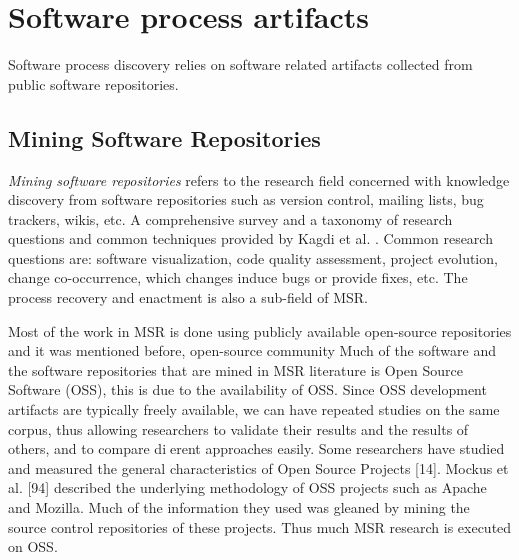 \chapter{Software process artifacts}
Software process discovery relies on software related artifacts collected from public software repositories. 

\section{Mining Software Repositories}
\textit{Mining software repositories} refers to the research field concerned with knowledge discovery from 
software repositories such as version control, mailing lists, bug trackers, wikis, etc. 
A comprehensive survey and a taxonomy of research questions and common techniques provided by 
Kagdi et al. \cite{citeulike:4534888}. Common research questions are: software visualization, 
code quality assessment, project evolution, change co-occurrence, which changes induce bugs or provide fixes, 
etc. The process recovery and enactment is also a  sub-field of MSR. 

Most of the work in MSR is done using publicly available open-source repositories and it was mentioned before, open-source community Much of the software and the software repositories that are mined in MSR literature is Open Source
Software (OSS), this is due to the availability of OSS. Since OSS development artifacts are typically freely
available, we can have repeated studies on the same corpus, thus allowing researchers to validate their results
and the results of others, and to compare dierent approaches easily. Some researchers have studied and
measured the general characteristics of Open Source Projects [14]. Mockus et al. [94] described the underlying
methodology of OSS projects such as Apache and Mozilla. Much of the information they used was gleaned
by mining the source control repositories of these projects. Thus much MSR research is executed on OSS.